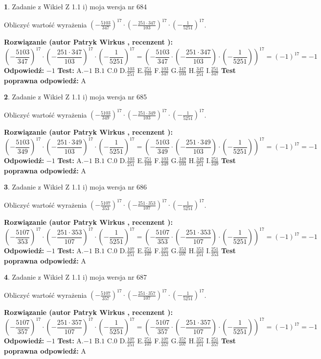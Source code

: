 \documentclass[12pt, a4paper]{article}
\theoremstyle{definition} %
\newtheorem{zad}{}
\newcommand{\zadStart}[1]{\begin{zad}#1\newline}
\newcommand{\zadStop}{\end{zad}}
\newcommand{\rozwStart}[2]{\noindent \textbf{Rozwiązanie (autor #1 , recenzent #2): }\newline}
\newcommand{\rozwStop}{\newline}
\newcommand{\odpStart}{\noindent \textbf{Odpowiedź:}\newline}
\newcommand{\odpStop}{\newline}
\newcommand{\testStart}{\noindent \textbf{Test:}\newline}
\newcommand{\testStop}{\newline}
\newcommand{\kluczStart}{\noindent \textbf{Test poprawna odpowiedź:}\newline}
\newcommand{\kluczStop}{\newline}
\begin{document}
\zadStart{Zadanie z Wikieł Z 1.1 i) moja wersja nr 684}

Obliczyć wartość wyrażenia $(-\frac{5103}{347})^{17} \cdot (-\frac{251 \cdot 347}{103})^{17} \cdot (-\frac{1}{5251})^{17}$.
\zadStop
\rozwStart{Patryk Wirkus}{}
$$(-\frac{5103}{347})^{17} \cdot (-\frac{251 \cdot 347}{103})^{17} \cdot (-\frac{1}{5251})^{17} = (-\frac{5103}{347} \cdot (-\frac{251 \cdot 347}{103}) \cdot (-\frac{1}{5251}))^{17} = (-1)^{17} = -1$$
\rozwStop
\odpStart
$-1$
\odpStop
\testStart
A.$-1$ B.$1$ C.$0$ D.$\frac{103}{251}$ E.$\frac{251}{103}$
F.$\frac{103}{347}$ G.$\frac{347}{103}$
H.$\frac{347}{251}$
I.$\frac{251}{347}$
\testStop
\kluczStart
A
\kluczStop



\zadStart{Zadanie z Wikieł Z 1.1 i) moja wersja nr 685}

Obliczyć wartość wyrażenia $(-\frac{5103}{349})^{17} \cdot (-\frac{251 \cdot 349}{103})^{17} \cdot (-\frac{1}{5251})^{17}$.
\zadStop
\rozwStart{Patryk Wirkus}{}
$$(-\frac{5103}{349})^{17} \cdot (-\frac{251 \cdot 349}{103})^{17} \cdot (-\frac{1}{5251})^{17} = (-\frac{5103}{349} \cdot (-\frac{251 \cdot 349}{103}) \cdot (-\frac{1}{5251}))^{17} = (-1)^{17} = -1$$
\rozwStop
\odpStart
$-1$
\odpStop
\testStart
A.$-1$ B.$1$ C.$0$ D.$\frac{103}{251}$ E.$\frac{251}{103}$
F.$\frac{103}{349}$ G.$\frac{349}{103}$
H.$\frac{349}{251}$
I.$\frac{251}{349}$
\testStop
\kluczStart
A
\kluczStop



\zadStart{Zadanie z Wikieł Z 1.1 i) moja wersja nr 686}

Obliczyć wartość wyrażenia $(-\frac{5107}{353})^{17} \cdot (-\frac{251 \cdot 353}{107})^{17} \cdot (-\frac{1}{5251})^{17}$.
\zadStop
\rozwStart{Patryk Wirkus}{}
$$(-\frac{5107}{353})^{17} \cdot (-\frac{251 \cdot 353}{107})^{17} \cdot (-\frac{1}{5251})^{17} = (-\frac{5107}{353} \cdot (-\frac{251 \cdot 353}{107}) \cdot (-\frac{1}{5251}))^{17} = (-1)^{17} = -1$$
\rozwStop
\odpStart
$-1$
\odpStop
\testStart
A.$-1$ B.$1$ C.$0$ D.$\frac{107}{251}$ E.$\frac{251}{107}$
F.$\frac{107}{353}$ G.$\frac{353}{107}$
H.$\frac{353}{251}$
I.$\frac{251}{353}$
\testStop
\kluczStart
A
\kluczStop



\zadStart{Zadanie z Wikieł Z 1.1 i) moja wersja nr 687}

Obliczyć wartość wyrażenia $(-\frac{5107}{357})^{17} \cdot (-\frac{251 \cdot 357}{107})^{17} \cdot (-\frac{1}{5251})^{17}$.
\zadStop
\rozwStart{Patryk Wirkus}{}
$$(-\frac{5107}{357})^{17} \cdot (-\frac{251 \cdot 357}{107})^{17} \cdot (-\frac{1}{5251})^{17} = (-\frac{5107}{357} \cdot (-\frac{251 \cdot 357}{107}) \cdot (-\frac{1}{5251}))^{17} = (-1)^{17} = -1$$
\rozwStop
\odpStart
$-1$
\odpStop
\testStart
A.$-1$ B.$1$ C.$0$ D.$\frac{107}{251}$ E.$\frac{251}{107}$
F.$\frac{107}{357}$ G.$\frac{357}{107}$
H.$\frac{357}{251}$
I.$\frac{251}{357}$
\testStop
\kluczStart
A
\kluczStop
\end{document}
